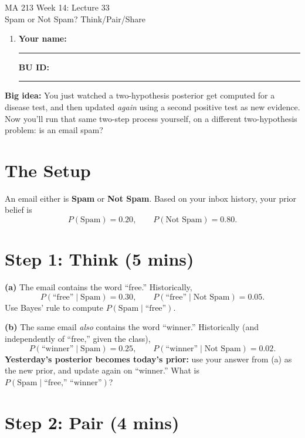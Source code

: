 \documentclass{article}
\newcommand{\coursenumber}{MA 213}
\newcommand{\weekplaceholder}{14}
\newcommand{\lectureplaceholder}{33}
\newcommand{\lecturetitle}{Spam or Not Spam? Think/Pair/Share}
\newcommand{\nameblank}{\rule{1.75in}{0.4pt}}
\newcommand{\idblank}{\rule{1.55in}{0.4pt}}
\begin{document}
\begin{center}
  {\LARGE \coursenumber{} Week \weekplaceholder{}: Lecture \lectureplaceholder{}}\\
  {\large \lecturetitle{}}
\end{center}

\begin{enumerate}[label=\arabic*.,leftmargin=*,itemsep=.7em]
  \item \textbf{Your name:} \nameblank \hfill \textbf{BU ID:} \idblank
\end{enumerate}

\textbf{Big idea:} You just watched a two-hypothesis posterior get computed for a disease test, and then updated \emph{again} using a second positive test as new evidence. Now you'll run that same two-step process yourself, on a different two-hypothesis problem: is an email spam?

\section*{The Setup}

An email either is \textbf{Spam} or \textbf{Not Spam}. Based on your inbox history, your prior belief is
\[
P(\text{Spam}) = 0.20, \qquad P(\text{Not Spam}) = 0.80.
\]

\section*{Step 1: Think (5 mins)}

\textbf{(a)} The email contains the word ``free.'' Historically,
\[
P(\text{``free''} \mid \text{Spam}) = 0.30, \qquad P(\text{``free''} \mid \text{Not Spam}) = 0.05.
\]
Use Bayes' rule to compute $P(\text{Spam} \mid \text{``free''})$.
\vspace{0.4in}

\textbf{(b)} The same email \emph{also} contains the word ``winner.'' Historically (and independently of ``free,'' given the class),
\[
P(\text{``winner''} \mid \text{Spam}) = 0.25, \qquad P(\text{``winner''} \mid \text{Not Spam}) = 0.02.
\]
\textbf{Yesterday's posterior becomes today's prior:} use your answer from (a) as the new prior, and update again on ``winner.'' What is $P(\text{Spam} \mid \text{``free,'' ``winner''})$?
\vspace{0.4in}

\section*{Step 2: Pair (4 mins)}
\end{document}
